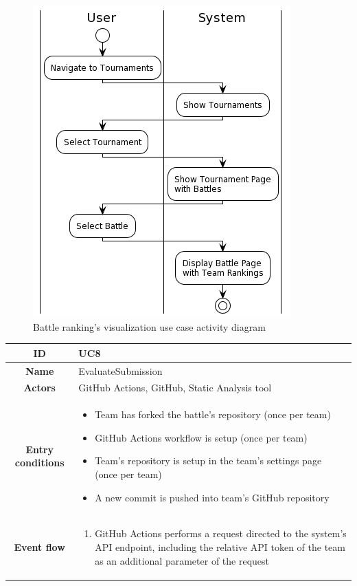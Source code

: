 \begin{center}
\begin{figure}[H]
        \includegraphics[scale=0.5]{Diagrams/activity_visualizebattlerank.png}
        \caption{Battle ranking's visualization use case activity diagram}
    \end{figure}
    \begin{tabular}{ |c|m{10cm}| }
        \hline
        \textbf{ID} & UC8 \\
        \hline
        \textbf{Name} & EvaluateSubmission \\
        \hline
        \textbf{Actors} & GitHub Actions, GitHub, Static Analysis tool \\
        \hline
        \textbf{Entry conditions} &
        \begin{itemize}
            \item Team has forked the battle's repository (once per team)
            \item GitHub Actions workflow is setup (once per team)
            \item Team’s repository is setup in the team’s settings page (once per team)
            \item A new commit is pushed into team’s GitHub repository
        \end{itemize} \\
        \hline
        \textbf{Event flow} &
        \begin{enumerate}
            \item GitHub Actions performs a request directed to the system’s API endpoint, including the relative API token of the team as an additional parameter of the request

\end{enumerate}
\end{tabular}
\end{center}
